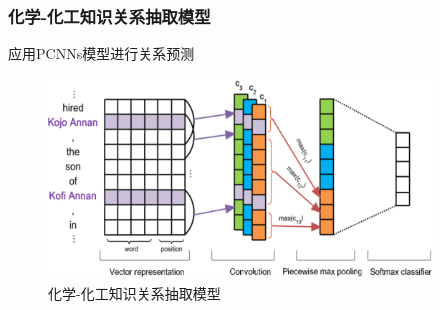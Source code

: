 \begin{frame}
	\frametitle{化学-化工知识关系抽取模型}
	应用\textrm{PCNNs}模型进行关系预测
\begin{figure}[h!]
\centering
\includegraphics[height=2.10in,width=4.00in,viewport=0 0 130 70,clip]{Figures/KG_Chem-PCNNs.png}
\caption{\tiny 化学-化工知识关系抽取模型}%
\label{Fig:KG_Chem-PCNNs}
\end{figure}
\end{frame}

